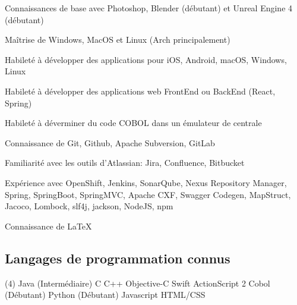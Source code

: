 \begin{cvitems}
\item{Connaissances de base avec Photoshop, Blender (débutant) et Unreal Engine 4 (débutant)}
\item{Maîtrise de Windows, MacOS et Linux (Arch principalement)}
\item{Habileté à développer des applications pour iOS, Android, macOS, Windows, Linux}
\item{Habileté à développer des applications web FrontEnd ou BackEnd (React, Spring)}
\item{Habileté à déverminer du code COBOL dans un émulateur de centrale}
\item{Connaissance de Git, Github, Apache Subversion, GitLab}
\item{Familiarité avec les outils d'Atlassian: Jira, Confluence, Bitbucket}
\item{Expérience avec OpenShift, Jenkins, SonarQube, Nexus Repository Manager, Spring, SpringBoot, SpringMVC, Apache CXF, Swagger Codegen, MapStruct, Jacoco, Lombock, slf4j, jackson, NodeJS, npm}
\item{Connaissance de LaTeX}
\end{cvitems}
\subsection*{Langages de programmation connus}
\begin{tasks}(4)
    \task[•] Java (Intermédiaire) \task[•] C
    \task[•] C++ \task[•] Objective-C
    \task[•] Swift \task[•] ActionScript 2
    \task[•] Cobol (Débutant) \task[•] Python (Débutant)
    \task[•] Javascript \task[•] HTML/CSS
\end{tasks}
